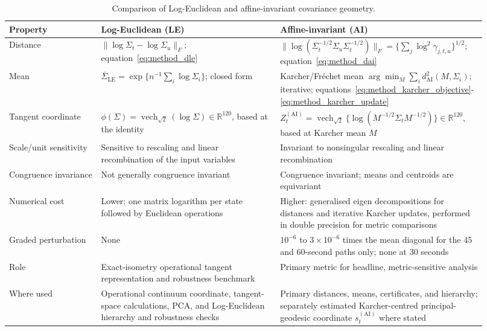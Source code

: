 
\begin{table}[!htbp]
\centering
\caption{Comparison of Log-Euclidean and affine-invariant covariance geometry.}
\label{tab:app_geometry_comparison}
\scriptsize
\begin{tabular}{@{}p{0.18\linewidth}p{0.35\linewidth}p{0.39\linewidth}@{}}
\toprule
Property & Log-Euclidean (LE) & Affine-invariant (AI)\\
\midrule
Distance
& \(\|\log\Sigma_t-\log\Sigma_u\|_F\);
equation~\eqref{eq:method_dle}
& \(\|\log(\Sigma_t^{-1/2}\Sigma_u\Sigma_t^{-1/2})\|_F
=\{\sum_j\log^2\gamma_{j,t,u}\}^{1/2}\);
equation~\eqref{eq:method_dai}\\

Mean
& \(\bar\Sigma_{\mathrm{LE}}
=\exp\{n^{-1}\sum_i\log\Sigma_i\}\); closed form
& Karcher/Fr\'echet mean
\(\arg\min_M\sum_i d_{\mathrm{AI}}^2(M,\Sigma_i)\); iterative;
equations~\eqref{eq:method_karcher_objective}-\eqref{eq:method_karcher_update}\\

Tangent coordinate
& \(\phi(\Sigma)=\operatorname{vech}_{\sqrt2}(\log\Sigma)
\in\mathbb R^{120}\), based at the identity
& \(Z_t^{(\mathrm{AI})}
=\operatorname{vech}_{\sqrt2}
\{\log(M^{-1/2}\Sigma_tM^{-1/2})\}\in\mathbb R^{120}\),
based at Karcher mean \(M\)\\

Scale/unit sensitivity
& Sensitive to rescaling and linear recombination of the input variables
& Invariant to nonsingular rescaling and linear recombination\\

Congruence invariance
& Not generally congruence invariant
& Congruence invariant; means and centroids are equivariant\\

Numerical cost
& Lower: one matrix logarithm per state followed by Euclidean operations
& Higher: generalised eigen decompositions for distances and iterative Karcher
updates, performed in double precision for metric comparisons\\

Graded perturbation
& None
& \(10^{-6}\) to \(3\times10^{-6}\) times the mean diagonal for the 45 and
60-second paths only; none at 30 seconds\\

Role
& Exact-isometry operational tangent representation and robustness benchmark
& Primary metric for headline, metric-sensitive analysis\\

Where used
& Operational continuum coordinate, tangent-space calculations, PCA, and
Log-Euclidean hierarchy and robustness checks
& Primary distances, means, certificates, and hierarchy; separately estimated
Karcher-centred principal-geodesic coordinate \(s_t^{(\mathrm{AI})}\) where stated\\
\bottomrule
\end{tabular}
\end{table}
